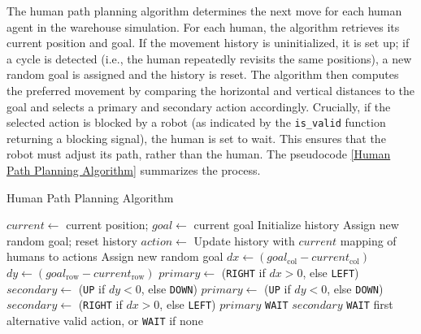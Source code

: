 \documentclass{kththesis}
\begin{document}
The human path planning algorithm determines the next move for each human agent in the warehouse simulation. For each human, the algorithm retrieves its current position and goal. If the movement history is uninitialized, it is set up; if a cycle is detected (i.e., the human repeatedly revisits the same positions), a new random goal is assigned and the history is reset. The algorithm then computes the preferred movement by comparing the horizontal and vertical distances to the goal and selects a primary and secondary action accordingly. Crucially, if the selected action is blocked by a robot (as indicated by the \texttt{is\_valid} function returning a blocking signal), the human is set to wait. This ensures that the robot must adjust its path, rather than the human. The pseudocode \ref{Human Path Planning Algorithm} summarizes the process.

\begin{algorithm}
\caption{Human Path Planning Algorithm}
\label{Human Path Planning Algorithm}
\begin{algorithmic}[1]
    \State $current \gets$ current position; $goal \gets$ current goal
        \State Initialize history
    \EndIf
        \State Assign new random goal; reset history
    \EndIf
    \State $action \gets$ 
    \State Update history with $current$
\EndFor
\State \Return mapping of humans to actions
        \State Assign new random goal
    \EndIf
    \State $dx \gets (goal_{\text{col}} - current_{\text{col}})$
    \State $dy \gets (goal_{\text{row}} - current_{\text{row}})$
        \State $primary \gets$ (\texttt{RIGHT} if $dx > 0$, else \texttt{LEFT})
        \State $secondary \gets$ (\texttt{UP} if $dy < 0$, else \texttt{DOWN})
    \Else
        \State $primary \gets$ (\texttt{UP} if $dy < 0$, else \texttt{DOWN})
        \State $secondary \gets$ (\texttt{RIGHT} if $dx > 0$, else \texttt{LEFT})
    \EndIf
        \State \Return $primary$
        \State \Return \texttt{WAIT}
        \State \Return $secondary$
        \State \Return \texttt{WAIT}
    \Else
        \State \Return first alternative valid action, or \texttt{WAIT} if none
    \EndIf
\EndFunction
\end{algorithmic}
\end{algorithm}
\end{document}
